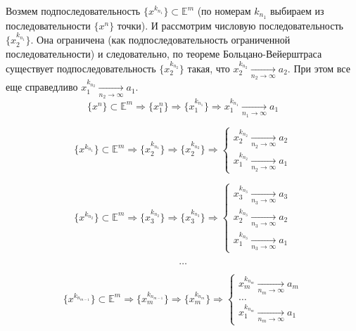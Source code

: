 \documentclass[a4paper,12pt]{article} %
\begin{document}
\noindent Возмем подпоследовательность $\{x^{k_{n_1}} \} \subset \mathbb{E}^m$ (по номерам $k_{n_1}$ выбираем из последовательности $\{x^n \}$ точки). И рассмотрим числовую последовательность $\{x_2^{k_{n_1}} \}$. Она ограничена (как подпоследовательность ограниченной последовательности) и следовательно, по теореме Больцано-Вейерштраса существует подпоследовательность $\{x_2^{k_{n_2}} \}$ такая, что $x_2^{k_{n_2}} \xrightarrow[n_2 \to \infty]{} a_2$. При этом все еще справедливо $x_1^{k_{n_2}} \xrightarrow[n_2 \to \infty]{} a_1$.\\

\begin{equation*}
    \{x^n \} \subset \mathbb{E}^m \Rightarrow \{x_1^n \} \Rightarrow \{x_1^{k_{n_1}} \} \Rightarrow x_1^{k_{n_1}} \xrightarrow[n_1 \to \infty]{} a_1
\end{equation*}

\begin{equation*}
    \{x^{k_{n_1}} \} \subset \mathbb{E}^m \Rightarrow \{x_2^{k_{n_1}} \} \Rightarrow \{x_2^{k_{n_2}} \} \Rightarrow 
    \begin{cases}
        x_2^{k_{n_2}} \xrightarrow[n_2 \to \infty]{} a_2\\
        x_1^{k_{n_2}} \xrightarrow[n_2 \to \infty]{} a_1
    \end{cases}    
\end{equation*}

\begin{equation*}
    \{x^{k_{n_2}} \} \subset \mathbb{E}^m \Rightarrow \{x_3^{k_{n_2}} \} \Rightarrow \{x_3^{k_{n_3}} \} \Rightarrow 
    \begin{cases}
        x_3^{k_{n_3}} \xrightarrow[n_3 \to \infty]{} a_3\\
        x_2^{k_{n_3}} \xrightarrow[n_3 \to \infty]{} a_2\\
        x_1^{k_{n_3}} \xrightarrow[n_3 \to \infty]{} a_1
    \end{cases}    
\end{equation*}

\[ \dots \]

\begin{equation*}
    \{x^{k_{n_{m-1}}} \} \subset \mathbb{E}^m \Rightarrow \{x_m^{k_{n_{m-1}}} \} \Rightarrow \{x_m^{k_{n_m}} \} \Rightarrow 
    \begin{cases}
        x_m^{k_{n_m}} \xrightarrow[n_m \to \infty]{} a_m\\
        \dots \\
        x_1^{k_{n_m}} \xrightarrow[n_m \to \infty]{} a_1
    \end{cases}    
\end{equation*}
\end{document}
